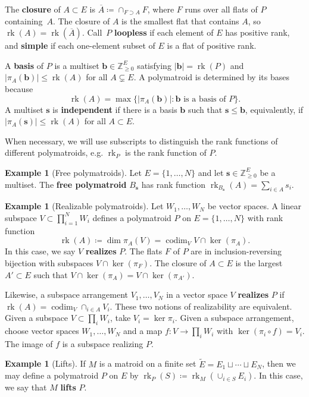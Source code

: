 \documentclass[11pt]{article}
\theoremstyle{definition}
\newtheorem{exam}[theo]{Example}
\numberwithin{equation}{section}
\newcommand{\N}{\mathbb{Z}_{\geq 0}}
\DeclareMathOperator{\rk}{rk}
\DeclareMathOperator{\codim}{codim}
\newcommand{\word}[1]{\textbf{#1}}
\begin{document}
The \word{closure} of $A \subset E$ is $\overline A \coloneqq  \cap_{F \supset A} F$, where $F$ runs over all flats of $P$ containing~$A$.
The closure of $A$ is the smallest flat that contains $A$, so $\rk(A) = \rk(\overline A)$.
Call~$P$ \word{loopless} if each element of $E$ has positive rank, and \word{simple} if each one-element subset of $E$ is a flat of positive rank.

A \word{basis} of $P$ is a multiset $\mathbf b \in \N^E$ satisfying $|\mathbf b| = \rk(P)$ and $|\pi_A(\mathbf b)| \leq \rk(A)$ for all $A \subsetneq E$.
A polymatroid is determined by its bases because 
\[
\rk(A) = \max \{ |\pi_A(\mathbf b)| : \mathbf b \text{ is a basis of $P$}\}.
\]
A multiset $\mathbf s$ is \word{independent} if there is a basis $\mathbf b$ such that $\mathbf s \leq \mathbf b$, equivalently, if $|\pi_A(\mathbf s)| \leq \rk(A)$ for all $A \subset E$.

When necessary, we will use subscripts to distinguish the rank functions of different polymatroids, e.g.  $\rk_P$  is the rank function of $P$.
\begin{exam}[Free polymatroids]\label{zb:free}
  Let $E = \{1, \ldots, N\}$ and let $\mathbf s \in \N^E$ be a multiset.
  The \word{free polymatroid} $B_{\mathbf s}$ has rank function
    $\rk_{B_{\mathbf s}}(A) = \sum_{i \in A} s_i$.
\end{exam}
\begin{exam}[Realizable polymatroids]\label{zb:geo}
  Let $W_1, \ldots, W_N$ be vector spaces.
  A linear subspace $V \subset \prod_{i=1}^N W_i$ defines a polymatroid $P$ on $E = \{1, \ldots, N\}$ with rank function
  \[ \rk(A) \coloneqq  \dim \pi_A(V) = \codim_V V \cap \ker(\pi_A). \]
  In this case, we say $V$ \word{realizes} $P$.
  The flats $F$ of $P$ are in inclusion-reversing bijection with subspaces $V \cap \ker(\pi_F)$.
  The closure of  $A \subset E$ is the largest  $A' \subset E$ such that $V \cap\ker(\pi_A) = V \cap \ker(\pi_{A'})$.

  Likewise, a subspace arrangement $V_1, \ldots, V_N$ in a vector space $V$ \word{realizes} $P$ if $\rk(A) = \codim_V \cap_{i \in A} V_i$.
  These two notions of realizability are equivalent. Given a subspace $V \subset \prod_i W_i$, take $V_i = \ker \pi_i$. Given a subspace arrangement, choose vector spaces $W_1, \ldots, W_N$ and a map $f: V \to \prod_i W_i$ with $\ker(\pi_i \circ f) = V_i$.
  The image of $f$ is a subspace realizing $P$.
\end{exam}
\begin{exam}[Lifts]\label{zb:partition}
  If $M$ is a matroid on a finite set $\widetilde E = E_1 \sqcup \cdots \sqcup E_N$, then we may define a polymatroid $P$ on $E$ by
  $\rk_P(S) \coloneqq  \rk_M(\cup_{i \in S} E_i)$. In this case, we say that $M$ \word{lifts} $P$.
\end{exam}
\end{document}

